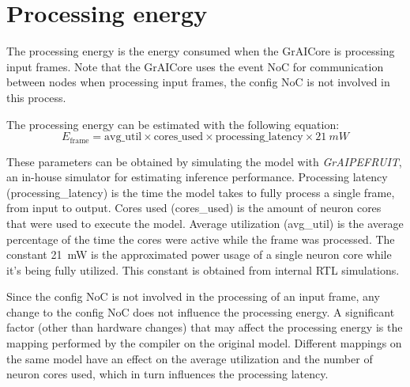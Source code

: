 \section{Processing energy}
The processing energy is the energy consumed when the GrAICore is processing input frames.
Note that the GrAICore uses the event NoC for communication between nodes when processing input frames, the config NoC is not involved in this process.

The processing energy can be estimated with the following equation:
\begin{equation}
    E_{\textrm{frame}} = \textrm{avg\_util} \times \textrm{cores\_used} \times \textrm{processing\_latency} \times \SI{21}{mW}
\end{equation}

These parameters can be obtained by simulating the model with \textit{GrAIPEFRUIT}, an in-house simulator for estimating inference performance.
Processing latency (\textrm{processing\_latency}) is the time the model takes to fully process a single frame, from input to output.
Cores used (\textrm{cores\_used}) is the amount of neuron cores that were used to execute the model.
Average utilization (\textrm{avg\_util}) is the average percentage of the time the cores were active while the frame was processed. 
The constant \SI{21}{mW} is the approximated power usage of a single neuron core while it's being fully utilized.
This constant is obtained from internal RTL simulations.

Since the config NoC is not involved in the processing of an input frame, any change to the config NoC does not influence the processing energy.
A significant factor (other than hardware changes) that may affect the processing energy is the mapping performed by the compiler on the original model. 
Different mappings on the same model have an effect on the average utilization and the number of neuron cores used, which in turn influences the processing latency.

